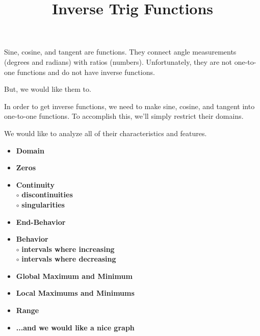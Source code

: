 \documentclass{ximera}
\title{Inverse Trig Functions}
\begin{document}
\begin{abstract}
%
\end{abstract}
\maketitle




Sine, cosine, and tangent are functions. They connect angle measurements (degrees and radians) with ratios (numbers). Unfortunately, they are not one-to-one functions and do not have inverse functions. 

But, we would like them to.

In order to get inverse functions, we need to make sine, cosine, and tangent into one-to-one functions.  To accomplish this, we'll simply restrict their domains. 




We would like to analyze all of their characteristics and features. 


\begin{itemize}
     \item \textbf{\textcolor{red!70!black}{Domain}} 
     \item \textbf{\textcolor{red!70!black}{Zeros}} 
     \item \textbf{\textcolor{red!70!black}{Continuity}} \\
     \text{    }$\circ$ \textbf{\textcolor{purple!85!blue}{discontinuities}}\\
     \text{    }$\circ$ \textbf{\textcolor{purple!85!blue}{singularities}}\\
     \item \textbf{\textcolor{red!70!black}{End-Behavior}} 
     \item \textbf{\textcolor{red!70!black}{Behavior}} \\
     \text{    }$\circ$ \textbf{\textcolor{purple!85!blue}{intervals where increasing}}\\
     \text{    }$\circ$ \textbf{\textcolor{purple!85!blue}{intervals where decreasing}}\\
     \item \textbf{\textcolor{red!70!black}{Global Maximum and Minimum}} 
     \item \textbf{\textcolor{red!70!black}{Local Maximums and Minimums}} 
     \item \textbf{\textcolor{red!70!black}{Range}} 
     \item \textbf{\textcolor{blue!55!black}{...and we would like a nice graph}} 
\end{itemize}
\end{document}

